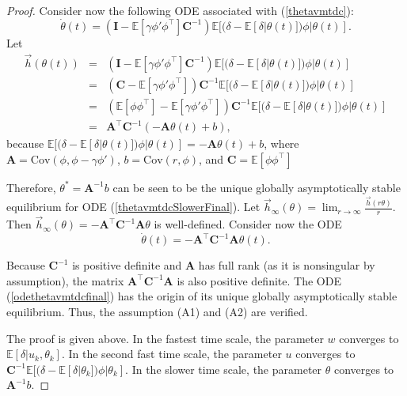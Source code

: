 \begin{proof}
Consider now the following ODE associated with (\ref{thetavmtdc}):
\begin{equation}
 \dot{{\theta}}(t) = (\textbf{I} - \mathbb{E}[\gamma {\phi}' {\phi}^{\top}]\textbf{C}^{-1})\mathbb{E}[(\delta -\mathbb{E}[\delta|{\theta}(t)]) {\phi}|{\theta}(t)].
    \label{thetavmtdcSlowerFinal}
\end{equation}
Let 
\begin{equation*}
\begin{array}{ccl}
 \vec{h}({\theta}(t))&=&(\textbf{I} - \mathbb{E}[\gamma {\phi}' {\phi}^{\top}]\textbf{C}^{-1})\mathbb{E}[(\delta -\mathbb{E}[\delta|{\theta}(t)]) {\phi}|{\theta}(t)]\\
    &=&(\textbf{C} - \mathbb{E}[\gamma {\phi}' {\phi}^{\top}])\textbf{C}^{-1}\mathbb{E}[(\delta -\mathbb{E}[\delta|{\theta}(t)]) {\phi}|{\theta}(t)]\\
    &=& (\mathbb{E}[{\phi} {\phi}^{\top}] - \mathbb{E}[\gamma {\phi}' {\phi}^{\top}])\textbf{C}^{-1}\mathbb{E}[(\delta -\mathbb{E}[\delta|{\theta}(t)]) {\phi}|{\theta}(t)]\\
    &=& \textbf{A}^{\top}\textbf{C}^{-1}(-\textbf{A}{\theta}(t)+{b}),
\end{array}
\end{equation*}
because $\mathbb{E}[(\delta -\mathbb{E}[\delta|{\theta}(t)]) {\phi}|{\theta}(t)]=-\textbf{A}{\theta}(t)+{b}$, where 
$\textbf{A} = \mathrm{Cov}({\phi},{\phi}-\gamma{\phi}')$, ${b}=\mathrm{Cov}(r,{\phi})$, and $\textbf{C}=\mathbb{E}[{\phi}{\phi}^{\top}]$

Therefore,
${\theta}^*=\textbf{A}^{-1}{b}$ can be seen to be the unique globally asymptotically
stable equilibrium for ODE (\ref{thetavmtdcSlowerFinal}).
Let $\vec{h}_{\infty}({\theta})=\lim_{r\rightarrow
\infty}\frac{\vec{h}(r{\theta})}{r}$. Then
$\vec{h}_{\infty}({\theta})=-\textbf{A}^{\top}\textbf{C}^{-1}\textbf{A}{\theta}$ is well-defined. 
Consider now the ODE
\begin{equation}
\dot{{\theta}}(t)=-\textbf{A}^{\top}\textbf{C}^{-1}\textbf{A}{\theta}(t).
\label{odethetavmtdcfinal}
\end{equation}

Because $\textbf{C}^{-1}$ is positive definite and $\textbf{A}$ has full rank (as it
is nonsingular by assumption), the matrix $\textbf{A}^{\top} \textbf{C}^{-1}\textbf{A}$ is also
positive definite. 
The ODE (\ref{odethetavmtdcfinal}) has the origin of its unique globally asymptotically stable equilibrium.
Thus, the assumption (A1) and (A2) are verified.

The proof is given above.
In the fastest time scale, the parameter $w$ converges to
$\mathbb{E}[\delta|{u}_k,{\theta}_k]$.
In the second fast time scale,
the parameter $u$ converges to $\textbf{C}^{-1}\mathbb{E}[(\delta-\mathbb{E}[\delta|{\theta}_k]){\phi}|{\theta}_k]$.
In the slower time scale,
the parameter ${\theta}$ converges to $\textbf{A}^{-1}{b}$.
\end{proof}

